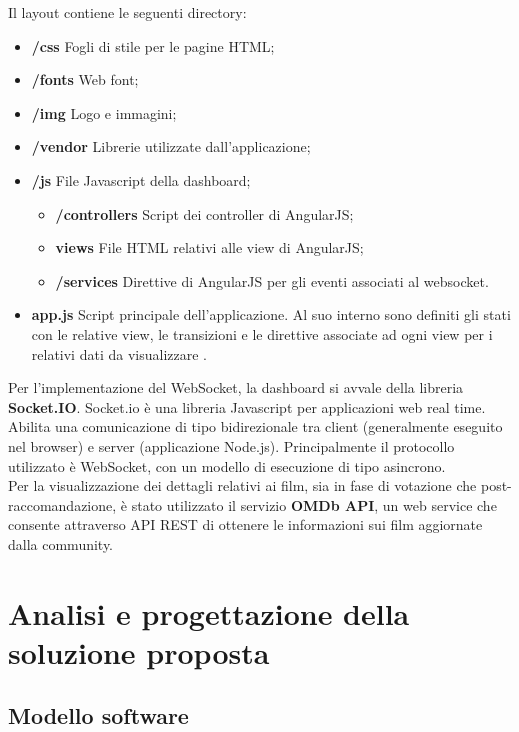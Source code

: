 \documentclass[12pt]{article}
\begin{document}
Il layout contiene le seguenti directory: 
\begin{itemize}
	\item \textbf{/css} Fogli di stile per le pagine HTML;
	\item \textbf{/fonts} Web font;
	\item \textbf{/img} Logo e immagini;
	\item \textbf{/vendor} Librerie utilizzate dall'applicazione;
	\item \textbf{/js} File Javascript della dashboard;
	\begin{itemize}
		\item \textbf{/controllers} Script dei controller di AngularJS;
		\item \textbf{views} File HTML relativi alle view di AngularJS;
		\item \textbf{/services} Direttive di AngularJS per gli eventi associati al websocket.
	\end{itemize}
	\item \textbf{app.js} Script principale dell'applicazione. Al suo interno sono definiti gli stati con le relative view, le transizioni e le direttive associate ad ogni view per i relativi dati da visualizzare \cite{angularjs}.
\end{itemize}

Per l'implementazione del WebSocket, la dashboard si avvale della libreria \textbf{Socket.IO}. Socket.io è una libreria Javascript per applicazioni web real time. Abilita una comunicazione di tipo bidirezionale tra client (generalmente eseguito nel browser) e server (applicazione Node.js). Principalmente il protocollo utilizzato è WebSocket, con un modello di esecuzione di tipo asincrono. \\

Per la visualizzazione dei dettagli relativi ai film, sia in fase di votazione che post-raccomandazione, è stato utilizzato il servizio \textbf{OMDb API}, un web service che consente attraverso API REST di ottenere le informazioni sui film aggiornate dalla community.

\section{Analisi e progettazione della soluzione proposta}

\subsection {Modello software}
\end{document}
